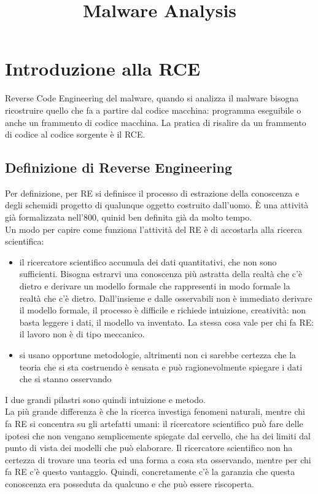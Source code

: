 \documentclass{article}
\title{Malware Analysis}
\begin{document}
\maketitle
\tableofcontents
\section{Introduzione alla RCE}
Reverse Code Engineering del malware, quando si analizza il malware bisogna ricostruire quello che fa a partire dal codice macchina: programma eseguibile o anche un frammento di codice macchina. La pratica di risalire da un frammento di codice al codice sorgente è il RCE.
\subsection{Definizione di Reverse Engineering}
Per definizione, per RE si definisce il processo di estrazione della conoscenza e degli schemidi progetto di qualunque oggetto costruito dall'uomo. È una attività già formalizzata nell'800, quinid ben definita già da molto tempo.\\ Un modo per capire come funziona l'attività del RE è di accostarla alla ricerca scientifica:
\begin{itemize}
\item il ricercatore scientifico accumula dei dati quantitativi, che non sono sufficienti. Bisogna estrarvi una conoscenza più astratta della realtà che c'è dietro e derivare un modello formale che rappresenti in modo formale la realtà che c'è dietro. Dall'insieme e dalle osservabili non è immediato derivare il modello formale, il processo è difficile e richiede intuizione, creatività: non basta leggere i dati, il modello va inventato. La stessa cosa vale per chi fa RE: il lavoro non è di tipo meccanico.
\item si usano opportune metodologie, altrimenti non ci sarebbe certezza che la teoria che si sta costruendo è sensata e può ragionevolmente spiegare i dati che si stanno osservando
\end{itemize}
I due grandi pilastri sono 	quindi intuizione e metodo.\\ La più grande differenza è che la ricerca investiga fenomeni naturali, mentre chi fa RE si concentra su gli artefatti umani: il ricercatore scientifico può fare delle ipotesi che non vengano semplicemente spiegate dal cervello, che ha dei limiti dal punto di vista dei modelli che può elaborare. Il ricercatore scientifico non ha certezza di trovare una teoria ed una forma a cosa sta osservando, mentre per chi fa RE c'è questo vantaggio. Quindi, concretamente c'è la garanzia che questa conoscenza era posseduta da qualcuno e che può essere riscoperta. 
\end{document}
